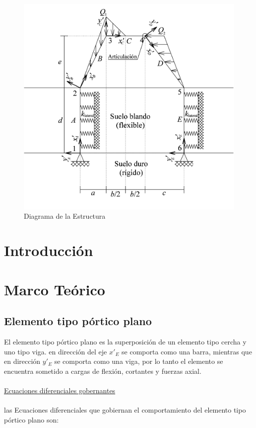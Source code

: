 \documentclass[a4paper]{article}
\begin{document}
\begin{figure}[htp]
    \centering
    \includegraphics[width=13cm]{Trabajo_diagrama_Diagrama Trbajo.png}
    \caption{Diagrama de la Estructura}
    \label{fig:estructura}
\end{figure}

\newpage

\section{Introducción}


\section{Marco Teórico}


\subsection{Elemento tipo pórtico plano}

El elemento tipo pórtico plano es la superposición de un elemento tipo cercha y uno tipo viga. en dirección del eje $x'_E$ se comporta como una barra, mientras que en dirección $y'_E$ se comporta como una viga, por lo tanto el elemento se encuentra sometido a cargas de flexión, cortantes y fuerzas axial.
\\
\\
\underline{Ecuaciones diferenciales gobernantes}
\\
\\
las Ecuaciones diferenciales que gobiernan el comportamiento del elemento tipo pórtico plano son:\\
\end{document}
